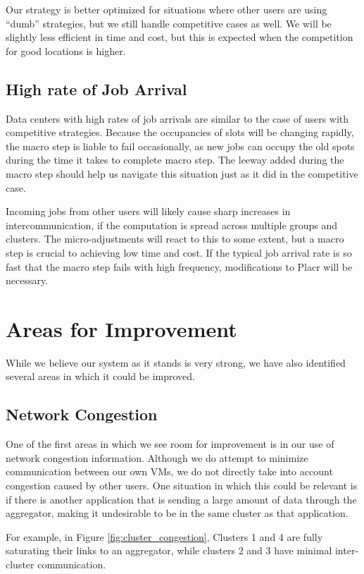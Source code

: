 \documentclass[11pt]{article}
\begin{document}
Our strategy is better optimized for situations where other users are using ``dumb'' strategies, but we still handle competitive cases as well. We will be slightly less efficient in time and cost, but this is expected when the competition for good locations is higher.

\subsection{High rate of Job Arrival}

Data centers with high rates of job arrivals are similar to the case of users with competitive strategies.  Because the occupancies of slots will be changing rapidly, the macro step is liable to fail occasionally, as new jobs can occupy the old spots during the time it takes to complete macro step. The leeway added during the macro step should help us navigate this situation just as it did in the competitive case.

Incoming jobs from other users will likely cause sharp increases in intercommunication, if the computation is spread across multiple groups and clusters.  The micro-adjustments will react to this to some extent, but a macro step is crucial to achieving low time and cost.  If the typical job arrival rate is so fast that the macro step fails with high frequency, modifications to Placr will be necessary.

\section{Areas for Improvement}

While we believe our system as it stands is very strong, we have also identified several areas in which it could be improved.

\subsection{Network Congestion}

One of the first areas in which we see room for improvement is in our use of network congestion information. Although we do attempt to minimize communication between our own VMs, we do not directly take into account congestion caused by other users.  One situation in which this could be relevant is if there is another application that is sending a large amount of data through the aggregator, making it undesirable to be in the same cluster as that application.

For example, in Figure \ref{fig:cluster_congestion}, Clusters 1 and 4 are fully saturating their links to an aggregator, while clusters 2 and 3 have minimal inter-cluster communication.
\end{document}
